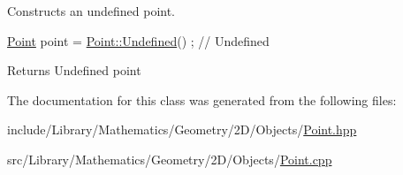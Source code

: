 Constructs an undefined point. 


\begin{DoxyCode}
\hyperlink{classlibrary_1_1math_1_1geom_1_1d2_1_1objects_1_1_point_a4998aefdf80bdfd967f21d49fa050398}{Point} point = \hyperlink{classlibrary_1_1math_1_1geom_1_1d2_1_1objects_1_1_point_a110a5bba9399abc5408f6c34306040c6}{Point::Undefined}() ; \textcolor{comment}{// Undefined}
\end{DoxyCode}


\begin{DoxyReturn}{Returns}
Undefined point 
\end{DoxyReturn}


The documentation for this class was generated from the following files\+:\begin{DoxyCompactItemize}
\item 
include/\+Library/\+Mathematics/\+Geometry/2\+D/\+Objects/\hyperlink{2_d_2_objects_2_point_8hpp}{Point.\+hpp}\item 
src/\+Library/\+Mathematics/\+Geometry/2\+D/\+Objects/\hyperlink{2_d_2_objects_2_point_8cpp}{Point.\+cpp}\end{DoxyCompactItemize}
